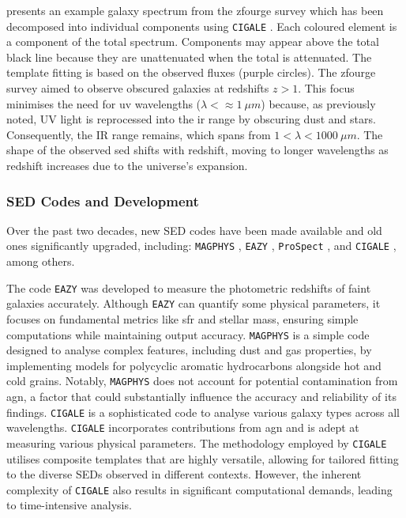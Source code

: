  presents an example galaxy spectrum from the \gls{zfourge} survey \citep{straatman_fourstar_2016} which has been decomposed into individual components using \texttt{CIGALE} \citep{boquien_cigale_2019}. Each coloured element is a component of the total spectrum. Components may appear above the total black line because they are unattenuated when the total is attenuated. The template fitting is based on the observed fluxes (purple circles). The \gls{zfourge} survey aimed to observe obscured galaxies at redshifts $z>1$. This focus minimises the need for \gls{uv} wavelengths ($\lambda < \approx 1 \ \mu m$) because, as previously noted, UV light is reprocessed into the \gls{ir} range by obscuring dust and stars. Consequently, the IR range remains, which spans from $1 < \lambda < 1000 \ \mu m$. The shape of the observed \gls{sed} shifts with redshift, moving to longer wavelengths as redshift increases due to the universe's expansion. 

\subsubsection{SED Codes and Development}
Over the past two decades, new SED codes have been made available and old ones significantly upgraded, including: \texttt{MAGPHYS} \citep{da_cunha_simple_2008}, \texttt{EAZY} \citep{brammer_eazy_2008}, \texttt{ProSpect} \citep{leja_deriving_2017, robotham_prospect_2020}, and \texttt{CIGALE} \citep{boquien_cigale_2019}, among others. 

The code \texttt{EAZY} was developed to measure the photometric redshifts of faint galaxies accurately. Although \texttt{EAZY} can quantify some physical parameters, it focuses on fundamental metrics like \gls{sfr} and stellar mass, ensuring simple computations while maintaining output accuracy. \texttt{MAGPHYS} is a simple code designed to analyse complex features, including dust and gas properties, by implementing models for polycyclic aromatic hydrocarbons alongside hot and cold grains. Notably, \texttt{MAGPHYS} does not account for potential contamination from \gls{agn}, a factor that could substantially influence the accuracy and reliability of its findings. \texttt{CIGALE} is a sophisticated code to analyse various galaxy types across all wavelengths. \texttt{CIGALE} incorporates contributions from \gls{agn} and is adept at measuring various physical parameters. The methodology employed by \texttt{CIGALE} utilises composite templates that are highly versatile, allowing for tailored fitting to the diverse SEDs observed in different contexts. However, the inherent complexity of \texttt{CIGALE} also results in significant computational demands, leading to time-intensive analysis.

